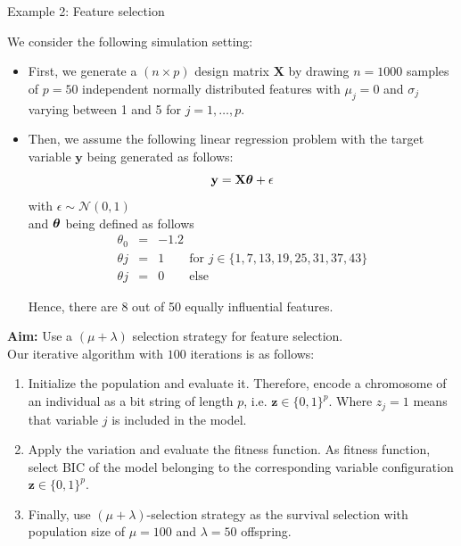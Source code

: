 \documentclass[11pt,compress,t,notes=noshow, xcolor=table]{beamer}
\begin{document}
\begin{vbframe}{Example 2: Feature selection}

We consider the following simulation setting:

\begin{itemize}
\item First, we generate a $(n \times p)$ design matrix $\mathbf{X}$ by drawing $n = 1000$ samples of $p = 50$ independent normally distributed features with $\mu_j = 0$ and $\sigma_j$ varying between 1 and 5 for $j = 1, \dots, p$.
\item Then, we assume the following linear regression problem with the target variable $\mathbf{y}$ being generated as follows: 
$$
\mathbf{y} = \mathbf{X}\bm{\theta} + \epsilon
$$
with $\epsilon \sim \mathcal N(0, 1)$\\
and $\bm{\theta}$ being defined as follows
\begin{eqnarray*}
\theta_{0} &=& - 1.2 \\
\theta{j} &=& 1 \qquad \text{for } j \in \{1, 7, 13, 19, 25, 31, 37, 43\} \\
\theta{j} &=& 0 \qquad \text{else}
\end{eqnarray*}

Hence, there are 8 out of 50 equally influential features.
 

\end{itemize}





\framebreak
\textbf{Aim:} Use a $(\mu + \lambda)$ selection strategy for feature selection.\\
\vspace*{0.2cm}
Our iterative algorithm with $100$ iterations is as follows:
\begin{enumerate}
\item Initialize the population and evaluate it. Therefore, encode a chromosome of an individual as a bit string of length $p$, i.e. $\textbf{z} \in \{0, 1\}^p$. Where $z_j =1$ means that variable $j$ is included in the model.
\item Apply the variation and evaluate the fitness function. As fitness function, select BIC of the model belonging to the corresponding variable configuration $\textbf{z} \in \{0, 1\}^p$.
\item Finally, use $(\mu + \lambda)$-selection strategy as the survival selection with population size of $\mu = 100$ and $\lambda =50$ offspring.
\end{enumerate}





\end{vbframe}
\end{document}
